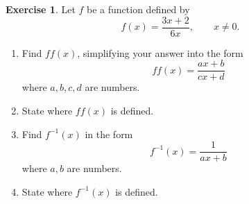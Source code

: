 \documentclass[a4paper]{article}
\theoremstyle{plain}
\theoremstyle{definition}
\newtheorem{exercise}{Exercise}
\numberwithin{equation}{subsection}
\begin{document}

\begin{exercise}
Let $f$ be a function defined by
\[
    f(x) = \frac{3x+2}{6x}, \qquad x \neq 0.
\]
\begin{enumerate}
    \item Find $ff(x)$, simplifying your answer into the form
    \[
        ff(x) = \frac{ax+b}{cx+d}
    \]
    where $a,b,c,d$ are numbers.
    \item State where $ff(x)$ is defined.
    \item Find $f^{-1}(x)$ in the form
    \[
        f^{-1}(x) = \frac{1}{ax+b}
    \]
    where $a,b$ are numbers.
    \item State where $f^{-1}(x)$ is defined.
\end{enumerate}
\end{exercise}
\end{document}
